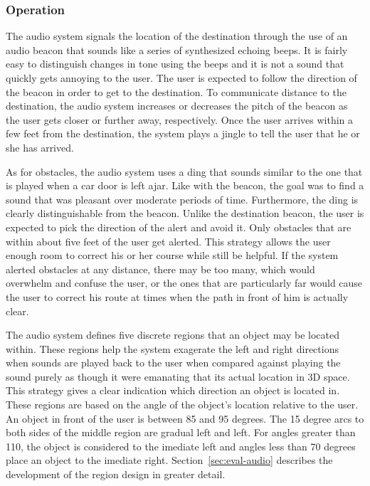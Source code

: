 \subsubsection{Operation}
\label{sec:technical-audio-op}

The audio system signals the location of the destination through the use of an
audio beacon that sounds like a series of synthesized echoing beeps. It is fairly
easy to distinguish changes in tone using the beeps and it is not a sound that
quickly gets annoying to the user. The user is expected to follow the direction
of the beacon in order to get to the destination. To communicate distance to the
destination, the audio system increases or decreases the pitch of the beacon as 
the user gets closer or further away, respectively. Once the user arrives within
a few feet from the destination, the system plays a jingle to tell the user that 
he or she has arrived. 

As for obstacles, the audio system uses a ding that sounds similar
to the one that is played when a car door is left ajar. Like with the beacon, 
the goal was to find a sound that was pleasant over moderate periods of time. 
Furthermore, the ding is clearly distinguishable from the beacon. Unlike the
destination beacon, the user is expected to pick the direction of the alert and
avoid it. Only obstacles that are within about five feet of the user get alerted.
This strategy allows the user enough room to correct his or her course while 
still be helpful. If the system alerted obstacles at any distance, there may be 
too many, which would overwhelm and confuse the user, or the ones that are 
particularly far would cause the user to correct his route at times when the 
path in front of him is actually clear.

The audio system defines five discrete regions that an object may be located
within. These regions help the system exagerate the left and right directions
when sounds are played back to the user when compared against playing the
sound purely as though it were emanating that its actual location in 3D space.
This strategy gives a clear indication which direction an object is located in.
These regions are based on the angle of the object's location relative to the
user. An object in front of the user is between 85 and 95 degrees. The 15 degree
arcs to both sides of the middle region are gradual left and left. For angles
greater than 110, the object is considered to the imediate left and angles less
than 70 degrees place an object to the imediate right.
Section~\ref{sec:eval-audio} describes the development of the region design in greater
detail.

